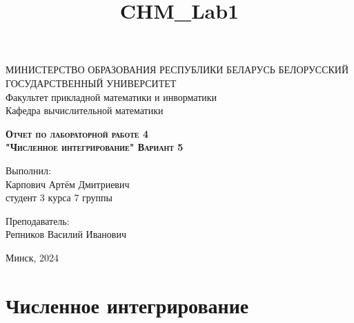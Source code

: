 \documentclass[11pt]{article}
\title{CHM\_Lab1}
\begin{document}
    
    \begin{titlepage}
    \newpage
    
    \begin{center}
    МИНИСТЕРСТВО ОБРАЗОВАНИЯ РЕСПУБЛИКИ БЕЛАРУСЬ БЕЛОРУССКИЙ ГОСУДАРСТВЕННЫЙ УНИВЕРСИТЕТ \\
    Факультет прикладной математики и инворматики \\ Кафедра вычислительной математики
 
    \end{center}
    
    \vspace{8em}
    
    \vspace{2em}
    
    \begin{center}
    \textsc{\textbf{Отчет по лабораторной работе 4 \\ "Численное интегрирование" \linebreak Вариант 5}}
    \end{center}
    
    \vspace{6em}
    
    \begin{flushright}
        Выполнил:\\
        Карпович Артём Дмитриевич\\
        студент 3 курса 7 группы
    \end{flushright}
    
    \begin{flushright}
        Преподаватель:\\
        Репников Василий Иванович
    \end{flushright}
    
    \vspace{\fill}
    
    \vspace{\fill}
    
    \begin{center}
    Минск, 2024
    \end{center}
    
    \end{titlepage}
    
    

    
    \section*{Численное интегрирование}
\end{document}
